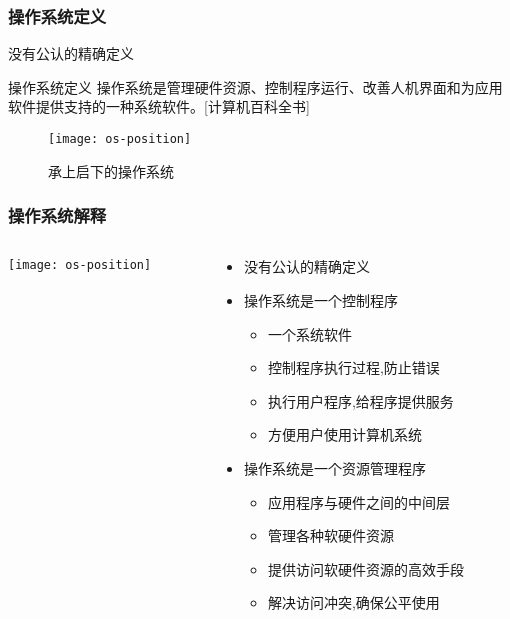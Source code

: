 \begin{frame}[plain]

\frametitle{操作系统定义}


没有公认的精确定义 \pause

\begin{block}{操作系统定义}
操作系统是管理硬件资源、控制程序运行、改善人机界面和为应用软件提供支持的一种系统软件。[计算机百科全书]
\end{block} \pause


\begin{figure}
	\centering
	\texttt{[image: os-position]}
	\caption{承上启下的操作系统}
\end{figure}

\end{frame}


\begin{frame}

\frametitle{操作系统解释}

\begin{columns}

\begin{column}{.6\linewidth}

	\texttt{[image: os-position]}

\end{column}

\begin{column}{.7\linewidth}
	
\begin{itemize}
\item 没有公认的精确定义 \pause
\item 操作系统是一个控制程序
	\begin{itemize}
	\item 一个系统软件
	\item 控制程序执行过程,防止错误
	\item 执行用户程序,给程序提供服务
	\item 方便用户使用计算机系统
	\end{itemize}
	\pause
	\item 操作系统是一个资源管理程序
	\begin{itemize}
		\item 应用程序与硬件之间的中间层
		\item 管理各种软硬件资源
		\item 提供访问软硬件资源的高效手段
		\item 解决访问冲突,确保公平使用
	\end{itemize}
\end{itemize}

\end{column}

\end{columns}

\end{frame}


